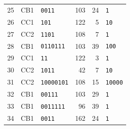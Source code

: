\begin{longtable}{@{}rllrrl@{}}
25 & CB1 & \texttt{0011} & 103 & 24 & \texttt{1}\\
26 & CC1 & \texttt{101} & 122 & 5 & \texttt{10}\\
27 & CC2 & \texttt{1101} & 108 & 7 & \texttt{1}\\
28 & CB1 & \texttt{0110111} & 103 & 39 & \texttt{100}\\
29 & CC1 & \texttt{11} & 122 & 3 & \texttt{1}\\
30 & CC2 & \texttt{1011} & 42 & 7 & \texttt{10}\\
31 & CC2 & \texttt{10000101} & 108 & 15 & \texttt{10000}\\
32 & CB1 & \texttt{00111} & 103 & 29 & \texttt{1}\\
33 & CB1 & \texttt{0011111} & 96 & 39 & \texttt{1}\\
34 & CB1 & \texttt{0011} & 162 & 24 & \texttt{1}\\
\bottomrule
\end{longtable}
